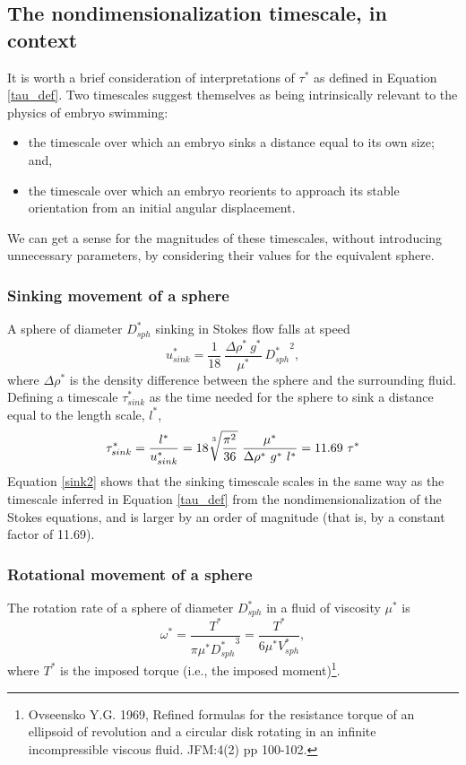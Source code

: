 \documentclass[10pt,a4paper]{article}
\begin{document}
\subsection{The nondimensionalization timescale, in context}
It is worth a brief consideration of interpretations of $\tau^*$ as defined in Equation \ref{tau_def}.
Two timescales suggest themselves as being intrinsically relevant to the physics of embryo swimming:
\begin{itemize}
	\item the timescale over which an embryo sinks a distance equal to its own size; and,
	\item the timescale over which an embryo reorients to approach its stable orientation from an initial angular displacement.
\end{itemize}
We can get a sense for the magnitudes of these timescales, without introducing unnecessary parameters, by considering their values for the equivalent sphere.

\subsubsection{Sinking movement of a sphere}\label{SinkSect}
A sphere of diameter $D_{sph}^*$ sinking in Stokes flow falls at speed
 \begin{equation}\label{sink1}
 	u_{sink}^* = \frac{1}{18} ~ \frac{\Delta \rho^* ~ g^*}{\mu^*}  ~ {D_{sph}^*}^2,
 \end{equation}
where $\Delta \rho^*$ is the density difference between the sphere and the surrounding fluid.
Defining a timescale $\tau^*_{sink}$ as the time needed for the sphere to sink a distance equal to the length scale, $l^*$,
\begin{equation}\label{sink2}
	\tau^*_{sink} = \frac{l^*}{u_{sink}^*} = 18 \sqrt[\uproot{5}3]{\frac{\pi^2}{36}} ~ \frac{\mu^*}{\Delta \rho^* ~ g^* ~ l^*} 
	              = 11.69 ~ \tau^*
\end{equation}
Equation \ref{sink2} shows that the sinking timescale scales in the same way as the timescale inferred in Equation \ref{tau_def} from the nondimensionalization of the Stokes equations, and is larger by an order of magnitude (that is, by a constant factor of 11.69).

\subsubsection{Rotational movement of a sphere}\label{RotSect}
The rotation rate of a sphere of diameter $D_{sph}^*$ in a fluid of viscosity $\mu^*$ is 
\begin{equation}\label{rot1}
	\omega^* = \frac{T^*}{\pi \mu^* {D_{sph}^*}^3} = \frac{T^*}{6 \mu^* V_{sph}^*},	
\end{equation}
where $T^*$ is the imposed torque (i.e., the imposed moment)\footnote{Ovseensko Y.G. 1969, Refined formulas for the resistance torque of an ellipsoid of revolution and a circular disk rotating in an infinite incompressible viscous fluid. JFM:4(2) pp 100-102.}.
\end{document}
